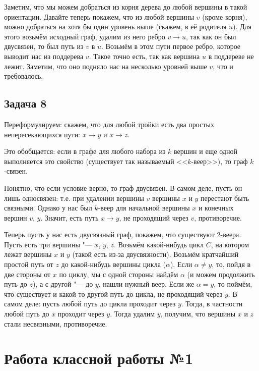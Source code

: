 	Заметим, что мы можем добраться из корня дерева до любой вершины в такой ориентации.
	Давайте теперь покажем, что из любой вершины $v$ (кроме корня), можно добраться на хотя бы один уровень выше
	(скажем, в её родителя $u$).
	Для этого возьмём исходный граф, удалим из него ребро $v \to u$, так как он был двусвязен,
	то был путь из $v$ в $u$.
	Возьмём в этом пути первое ребро, которое выводит нас из поддерева $v$.
	Такое точно есть, так как вершина $u$ в поддереве не лежит.
	Заметим, что оно подняло нас на несколько уровней выше $v$, что и требовалось.

\subsection{Задача 8}
	Переформулируем: скажем, что для любой тройки есть два простых непересекающихся пути:
	$x \to y$ и $x \to z$.
	\begin{Rem}
		Это обобщается: если в графе для любого набора из $k$ вершин и еще одной
		выполняется это свойство (существует так называемый <<$k$-веер>>), то граф
		$k$-связен.
	\end{Rem}
	Понятно, что если условие верно, то граф двусвязен.
	В самом деле, пусть он лишь односвязен: т.е. при удалении вершины $v$
	вершины $x$ и $y$ перестают быть связными.
	Однако у нас был $k$-веер для начальной вершины $x$ и конечных вершин $v$, $y$.
	Значит, есть путь $x \to y$, не проходящий через $v$, противоречие.

	Теперь пусть у нас есть двусвязный граф, покажем, что существуют 2-веера.
	Пусть есть три вершины "--- $x$, $y$, $z$.
	Возьмём какой-нибудь цикл $C$, на котором лежат вершины $x$ и $y$ (такой есть из-за двусвязности).
	Возьмём кратчайший простой путь от $z$ до какой-нибудь вершины цикла ($\alpha$).
	Если $\alpha\neq y$, то, пойдя в две стороны от $x$ по циклу, мы с одной стороны найдём
	$\alpha$ (и можем продолжить путь до $z$), а с другой "--- до $y$, нашли нужный веер.
	Если же $\alpha=y$, то поймём, что существует и какой-то другой путь до цикла, не проходящий через $y$.
	В самом деле: пусть любой путь до цикла проходит через $y$.
	Тогда, в частности любой путь до $x$ проходит через $y$.
	Тогда удалим $y$, получим, что вершины $x$ и $z$ стали несвязными, противоречие.

\section{Работа классной работы №1}
